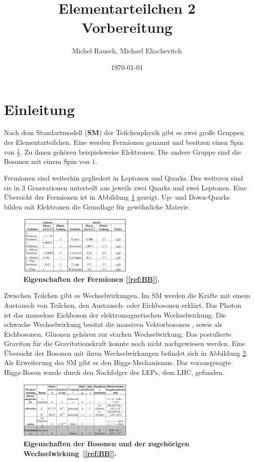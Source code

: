 \documentclass[a4paper,ngerman]{scrartcl}
\title{Elementarteilchen 2\\Vorbereitung}
\date{\today}
\author{Michel Rausch, Michael Eliachevitch}
\begin{document}
\maketitle
\tableofcontents
\newpage

\section{Einleitung}

Nach dem Standartmodell (\textbf{SM}) der Teilchenphysik gibt es zwei große Gruppen der Elementarteilchen.
Eine werden Fermionen genannt und besitzen einen Spin von $\frac{1}{2}$. 
Zu ihnen gehören beispielsweise Elektronen.
Die andere Gruppe sind die Bosonen mit einem Spin von $1$.

Fermionen sind weiterhin gegliedert in Leptonen und Quarks.
Des weiteren sind sie in 3 Generationen unterteilt aus jeweils zwei Quarks und zwei Leptonen. 
Eine Übersicht der Fermionen ist in Abbildung \ref{fig:fermionen} gezeigt.
Up- und Down-Quarks bilden mit Elektronen die Grundlage für gewöhnliche Materie.
\begin{figure}[tbh!]
\centering
\includegraphics[width=0.5\textwidth]{abbildungen/fermionen.png}
\caption{\textbf{Eigenschaften der Fermionen [\ref{ref:BB}].} 
}
\label{fig:fermionen}
\end{figure}

Zwischen Teilchen gibt es Wechselwirkungen.
Im SM werden die Kräfte mit einem Austausch von Teilchen, den Austausch- oder Eichbosonen erklärt.
Das Photon ist das masselose Eichboson der elektromagnetischen Wechselwirkung.
Die schwache Wechselwirkung besitzt die massiven Vektorbosonen \PWpm , sowie \PZzero als Eichbosonen.
Gluonen gehören zur starken Wechselwirkung.
Das postulierte Graviton für die Gravitationskraft konnte noch nicht nachgewiesen werden.
Eine Übersicht der Bosonen mit ihren Wechselwirkungen befindet sich in Abbildung \ref{fig:bosonen}.
Als Erweiterung des SM gibt es den Higgs-Mechanismus.
Das vorausgesagte Higgs-Boson wurde durch den Nachfolger des LEPs, dem LHC, gefunden.

\begin{figure}[tbh!]
\centering
\includegraphics[width=0.5\textwidth]{abbildungen/bosonen.png}
\caption{\textbf{Eigenschaften der Bosonen und der zugehörigen Wechselwirkung~[\ref{ref:BB}].} 
}
\label{fig:bosonen}
\end{figure}
\end{document}
